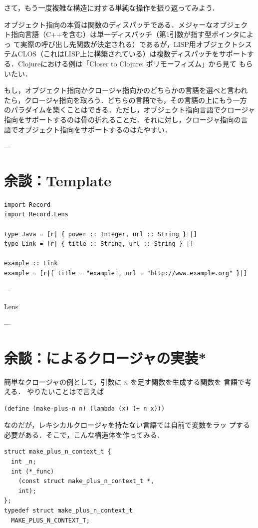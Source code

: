 \documentclass[a5paper,twoside,fleqn,draft]{jsbook}
\begin{document}
さて，もう一度複雑な構造に対する単純な操作を振り返ってみよう．

オブジェクト指向の本質は関数のディスパッチである．メジャーなオブジェク
ト指向言語（C++を含む）は単一ディスパッチ（第1引数が指す型ポインタによっ
て実際の呼び出し先関数が決定される）であるが，LISP用オブジェクトシス
テムCLOS（これはLISP上に構築されている）は複数ディスパッチをサポートす
る．Clojureにおける例は「Closer to Clojure: ポリモーフィズム」から見て
もらいたい．

もし，オブジェクト指向かクロージャ指向かのどちらかの言語を選べと言われ
たら，クロージャ指向を取ろう．どちらの言語でも，その言語の上にもう一方
のパラダイムを築くことはできる．ただし，オブジェクト指向言語でクロージャ
指向をサポートするのは骨の折れることだ．それに対し，クロージャ指向の言
語でオブジェクト指向をサポートするのはたやすい．

---

\section{余談：Template \haskell*}

\begin{verbatim}
import Record
import Record.Lens

type Java = [r| { power :: Integer, url :: String } |]
type Link = [r| { title :: String, url :: String } |]

example :: Link
example = [r|{ title = "example", url = "http://www.example.org" }|]
\end{verbatim}

---

Lens

---

\section*{余談：\clang によるクロージャの実装*}

簡単なクロージャの例として，引数に $n$ を足す関数を生成する関数を
\clang 言語で考える．
やりたいことは\scheme で言えば
\begin{schemecode}
\begin{verbatim}
(define (make-plus-n n) (lambda (x) (+ n x)))
\end{verbatim}
\end{schemecode}
なのだが，レキシカルクロージャを持たない\clang 言語では自前で変数をラッ
プする必要がある．そこで，こんな構造体を作ってみる．
\begin{ccode}
\begin{verbatim}
struct make_plus_n_context_t {
  int _n;
  int (*_func)
    (const struct make_plus_n_context_t *,
    int);
};
typedef struct make_plus_n_context_t
  MAKE_PLUS_N_CONTEXT_T;
\end{verbatim}
\end{ccode}
\end{document}
